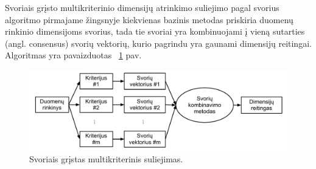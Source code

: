Svoriais grįsto multikriterinio dimensijų atrinkimo suliejimo pagal svorius algoritmo
pirmajame žingsnyje kiekvienas bazinis metodas priskiria duomenų rinkinio
dimensijoms svorius, tada tie svoriai yra kombinuojami į vieną sutarties
(angl. consensus) svorių vektorių, kurio pagrindu yra gaunami dimensijų 
reitingai. Algoritmas yra pavaizduotas ~\ref{fig:figure4} pav.
\begin{figure}
 \centering
 \includegraphics[width=1\textwidth]{images/score_based_fusion.pdf}
 \caption{Svoriais grįstas multikriterinis suliejimas.}
 \label{fig:figure4}
\end{figure}
